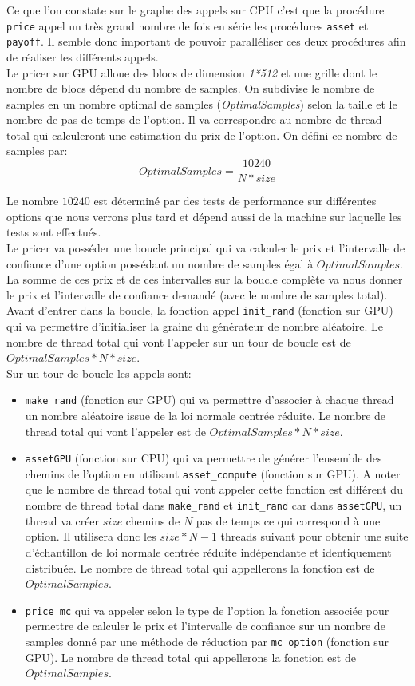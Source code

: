 \documentclass[french,12pt,a4paper]{article}
\begin{document}
Ce que l'on constate sur le graphe des appels sur CPU c'est que la procédure \lstinline!price! appel un très grand nombre de fois en série les procédures \lstinline!asset! et \lstinline!payoff!. Il semble donc important de pouvoir paralléliser ces deux procédures afin de réaliser les différents appels.\\

Le pricer sur GPU alloue des blocs de dimension \textit{1*512} et une grille dont le nombre de blocs dépend du nombre de samples. On subdivise le nombre de samples en un nombre optimal de samples (\textit{OptimalSamples}) selon la taille et le nombre de pas de temps de l'option. Il va correspondre au nombre de thread total qui calculeront une estimation du prix de l'option. On défini ce nombre de samples par: 
$$OptimalSamples = \frac{10 240}{N*size}$$

Le nombre $10 240$ est déterminé par des tests de performance sur différentes options que nous verrons plus tard et dépend aussi de la machine sur laquelle les tests sont effectués.\\

Le pricer va posséder une boucle principal qui va calculer le prix et l'intervalle de confiance d'une option possédant un nombre de samples égal à $OptimalSamples$. La somme de ces prix et de ces intervalles sur la boucle complète va nous donner le prix et l'intervalle de confiance demandé (avec le nombre de samples total).\\
Avant d'entrer dans la boucle, la fonction appel \lstinline!init_rand! (fonction sur GPU) qui va permettre d'initialiser la graine du générateur de nombre aléatoire. Le nombre de thread total qui vont l'appeler sur un tour de boucle est de $OptimalSamples*N*size$.\\
Sur un tour de boucle les appels sont:
\begin{itemize}
	\item \lstinline!make_rand! (fonction sur GPU) qui va permettre d'associer à chaque thread un nombre aléatoire issue de la loi normale centrée réduite. Le nombre de thread total qui vont l'appeler est de $OptimalSamples*N*size$.
	\item \lstinline!assetGPU! (fonction sur CPU) qui va permettre de générer l'ensemble des chemins de l'option en utilisant \lstinline!asset_compute! (fonction sur GPU). A noter que le nombre de thread total qui vont appeler cette fonction est différent du nombre de thread total dans \lstinline!make_rand! et \lstinline!init_rand! car dans \lstinline!assetGPU!, un thread va créer $size$ chemins de $N$ pas de temps ce qui correspond à une option. Il utilisera donc les $size * N - 1$ threads suivant pour obtenir une suite d'échantillon de loi normale centrée réduite indépendante et identiquement distribuée. Le nombre de thread total qui appellerons la fonction est de $OptimalSamples$.
	\item \lstinline!price_mc! qui va appeler selon le type de l'option la fonction associée pour permettre de calculer le prix et l'intervalle de confiance sur un nombre de samples donné par une méthode de réduction par \lstinline!mc_option! (fonction sur GPU). Le nombre de thread total qui appellerons la fonction est de $OptimalSamples$.
\end{itemize}
\end{document}
